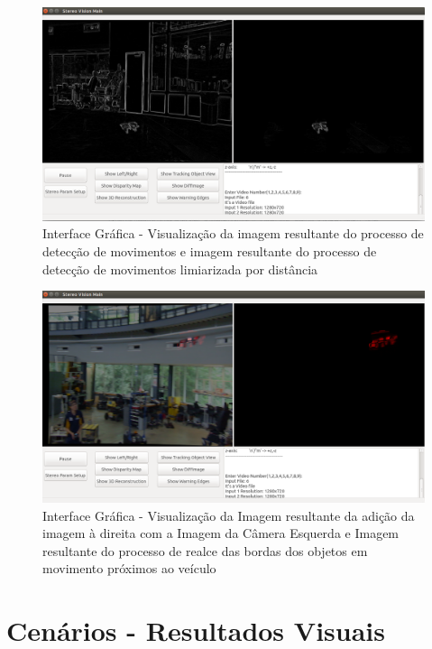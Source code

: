 \begin{figure}[H]
 	\centering
 	\includegraphics[scale=0.35]{./Resources/gui_showdiffimage_view.png}
 	\caption{Interface Gráfica - Visualização da imagem resultante do processo de detecção de movimentos e imagem resultante do processo de detecção de movimentos limiarizada por distância}
 	\label{gui_showdiffimage_view}
\end{figure}


\begin{figure}[H]
 	\centering
 	\includegraphics[scale=0.35]{./Resources/gui_showwarningedges_view.png}
 	\caption{Interface Gráfica - Visualização da Imagem resultante da adição da imagem à direita com a Imagem da Câmera Esquerda e Imagem resultante do processo de realce das bordas dos 
 	objetos em movimento próximos ao veículo}
 	\label{gui_showwarningedges_view}
\end{figure}


\section{Cenários - Resultados Visuais}
\label{resultsScenes}

